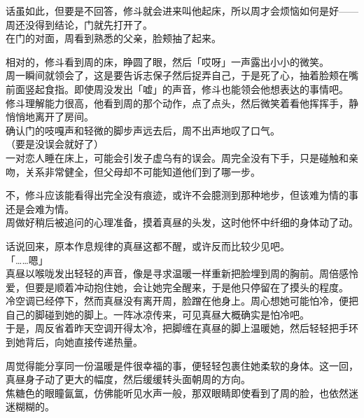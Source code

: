 话虽如此，但要是不回答，修斗就会进来叫他起床，所以周才会烦恼如何是好——周还没得到结论，门就先打开了。\\

在门的对面，周看到熟悉的父亲，脸颊抽了起来。

相对的，修斗看到周的床，睁圆了眼，然后「哎呀」一声露出小小的微笑。\\

周一瞬间就领会了，这是要告诉志保子然后捉弄自己，于是死了心，抽着脸颊在嘴前面竖起食指。即使周没发出「嘘」的声音，修斗也能领会他想表达的事情吧。\\

修斗理解能力很高，他看到周的那个动作，点了点头，然后微笑着看他挥挥手，静悄悄地离开了房间。\\

确认门的吱嘎声和轻微的脚步声远去后，周不出声地叹了口气。\\

（要是没误会就好了）\\

一对恋人睡在床上，可能会引发子虚乌有的误会。周完全没有下手，只是碰触和亲吻，关系非常健全，但父母却不可能知道他们到了哪一步。

不，修斗应该能看得出完全没有痕迹，或许不会臆测到那种地步，但该难为情的事还是会难为情。\\

周做好稍后被追问的心理准备，摸着真昼的头发，这时他怀中纤细的身体动了动。

话说回来，原本作息规律的真昼这都不醒，或许反而比较少见吧。\\

「……嗯」\\

真昼以喉咙发出轻轻的声音，像是寻求温暖一样重新把脸埋到周的胸前。周倍感怜爱，但要是顺着冲动抱住她，会让她完全醒来，于是他只停留在了摸头的程度。\\

冷空调已经停下，然而真昼没有离开周，脸蹭在他身上。周心想她可能怕冷，便把自己的脚碰到她的脚上。一阵冰凉传来，可见真昼大概确实是怕冷吧。\\

于是，周反省着昨天空调开得太冷，把脚缠在真昼的脚上温暖她，然后轻轻把手环到她背后，向她直接传递热量。

周觉得能分享同一份温暖是件很幸福的事，便轻轻包裹住她柔软的身体。这一回，真昼身子动了更大的幅度，然后缓缓转头面朝周的方向。\\

焦糖色的眼瞳氤氲，仿佛能听见水声一般，那双眼睛即使看到了周的脸，也依然迷迷糊糊的。

